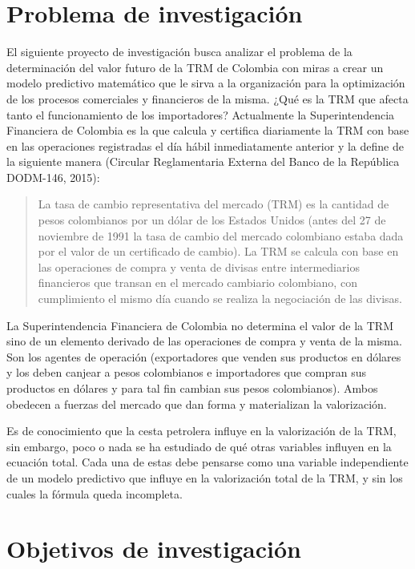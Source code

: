 \section{Problema de investigación}
El siguiente proyecto de investigación busca analizar el problema de la determinación del valor futuro de la TRM de Colombia con miras a crear un modelo predictivo matemático que le sirva a la organización para la optimización de los procesos comerciales y financieros de la misma. ¿Qué es la TRM que afecta tanto el funcionamiento de los importadores? Actualmente la Superintendencia Financiera de Colombia es la que calcula y certifica diariamente la TRM con base en las operaciones registradas el día hábil inmediatamente anterior y la define de la siguiente manera (Circular Reglamentaria Externa del Banco de la República DODM-146, 2015): 

\begin{quotation}La tasa de cambio representativa del mercado (TRM) es la cantidad de pesos colombianos por un dólar de los Estados Unidos (antes del 27 de noviembre de 1991 la tasa de cambio del mercado colombiano estaba dada por el valor de un certificado de cambio). La TRM se calcula con base en las operaciones de compra y venta de divisas entre intermediarios financieros que transan en el mercado cambiario colombiano, con cumplimiento el mismo día cuando se realiza la negociación de las divisas.  
\end{quotation}

La Superintendencia Financiera de Colombia no determina el valor de la TRM sino de un elemento derivado de las operaciones de compra y venta de la misma. Son los agentes de operación (exportadores que venden sus productos en dólares y los deben canjear a pesos colombianos e importadores que compran sus productos en dólares y para tal fin cambian sus pesos colombianos). Ambos obedecen a fuerzas del mercado que dan forma y materializan la valorización. 

Es de conocimiento que la cesta petrolera influye en la valorización de la TRM, sin embargo, poco o nada se ha estudiado de qué otras variables influyen en la ecuación total. Cada una de estas debe pensarse como una variable independiente de un modelo predictivo que influye en la valorización total de la TRM, y sin los cuales la fórmula queda incompleta. 

\section{Objetivos de investigación}
